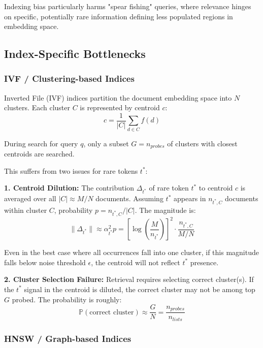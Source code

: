 \documentclass[conference,anonymous]{IEEEtran}
\begin{document}
Indexing bias particularly harms "spear fishing" queries, where relevance hinges on specific, potentially rare information defining less populated regions in embedding space.

\subsection{Index-Specific Bottlenecks}

\subsubsection{IVF / Clustering-based Indices}

Inverted File (IVF) indices partition the document embedding space into $N$ clusters. Each cluster $C$ is represented by centroid $c$:
\begin{equation}
c = \frac{1}{|C|}\sum_{d\in C} f(d)
\label{eq:centroid_calc}
\end{equation}

During search for query $q$, only a subset $G = n_{probes}$ of clusters with closest centroids are searched.

This suffers from two issues for rare tokens $t^*$:

\textbf{1. Centroid Dilution:} The contribution $\Delta_{t^*}$ of rare token $t^*$ to centroid $c$ is averaged over all $|C| \approx M/N$ documents. Assuming $t^*$ appears in $n_{t^*,C}$ documents within cluster $C$, probability $p = n_{t^*,C} / |C|$. The magnitude is:
\begin{equation}
\|\Delta_{t^*}\| \approx \alpha_{t^*}^2 p = \left[\log\!\left(\frac{M}{n_{t^*}}\right)\right]^2 \cdot \frac{n_{t^*,C}}{M/N}
\label{eq:centroid_signal_mag}
\end{equation}

Even in the best case where all occurrences fall into one cluster, if this magnitude falls below noise threshold $\epsilon$, the centroid will not reflect $t^*$ presence.

\textbf{2. Cluster Selection Failure:} Retrieval requires selecting correct cluster(s). If the $t^*$ signal in the centroid is diluted, the correct cluster may not be among top $G$ probed. The probability is roughly:
\begin{equation}
\mathbb{P}(\text{correct cluster}) \approx \frac{G}{N} = \frac{n_{probes}}{n_{lists}}
\label{eq:ivf_probe_prob}
\end{equation}

\subsubsection{HNSW / Graph-based Indices}
\end{document}
